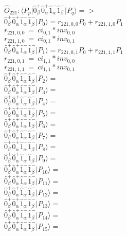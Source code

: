 \documentclass[14pt]{article}
\begin{document}
    $\hat{O}_{221}:  \langle{P_p}\vert \hat{0}_{\beta}^{+}\hat{0}_{\alpha}^{+}\hat{1}_{\alpha}^{-}\hat{1}_{\beta}^{-} \vert{P_q}\rangle => $ \\ 
    $ \hat{0}_{\beta}^{+}\hat{0}_{\alpha}^{+}\hat{1}_{\alpha}^{-}\hat{1}_{\beta}^{-} \vert{P_{0}}\rangle = {r}_{221,0,0}P_{0}+{r}_{221,1,0}P_{1} $ \\ 
    ${r}_{221,0,0}\ =\ {ci}_{0,1}*{inv}_{0,0} $ \\ 
    ${r}_{221,1,0}\ =\ {ci}_{0,1}*{inv}_{0,1} $ \\ 
    $ \hat{0}_{\beta}^{+}\hat{0}_{\alpha}^{+}\hat{1}_{\alpha}^{-}\hat{1}_{\beta}^{-} \vert{P_{1}}\rangle = {r}_{221,0,1}P_{0}+{r}_{221,1,1}P_{1} $ \\ 
    ${r}_{221,0,1}\ =\ {ci}_{1,1}*{inv}_{0,0} $ \\ 
    ${r}_{221,1,1}\ =\ {ci}_{1,1}*{inv}_{0,1} $ \\ 
    $ \hat{0}_{\beta}^{+}\hat{0}_{\alpha}^{+}\hat{1}_{\alpha}^{-}\hat{1}_{\beta}^{-} \vert{P_{2}}\rangle =  $ \\ 
    $ \hat{0}_{\beta}^{+}\hat{0}_{\alpha}^{+}\hat{1}_{\alpha}^{-}\hat{1}_{\beta}^{-} \vert{P_{3}}\rangle =  $ \\ 
    $ \hat{0}_{\beta}^{+}\hat{0}_{\alpha}^{+}\hat{1}_{\alpha}^{-}\hat{1}_{\beta}^{-} \vert{P_{4}}\rangle =  $ \\ 
    $ \hat{0}_{\beta}^{+}\hat{0}_{\alpha}^{+}\hat{1}_{\alpha}^{-}\hat{1}_{\beta}^{-} \vert{P_{5}}\rangle =  $ \\ 
    $ \hat{0}_{\beta}^{+}\hat{0}_{\alpha}^{+}\hat{1}_{\alpha}^{-}\hat{1}_{\beta}^{-} \vert{P_{6}}\rangle =  $ \\ 
    $ \hat{0}_{\beta}^{+}\hat{0}_{\alpha}^{+}\hat{1}_{\alpha}^{-}\hat{1}_{\beta}^{-} \vert{P_{7}}\rangle =  $ \\ 
    $ \hat{0}_{\beta}^{+}\hat{0}_{\alpha}^{+}\hat{1}_{\alpha}^{-}\hat{1}_{\beta}^{-} \vert{P_{8}}\rangle =  $ \\ 
    $ \hat{0}_{\beta}^{+}\hat{0}_{\alpha}^{+}\hat{1}_{\alpha}^{-}\hat{1}_{\beta}^{-} \vert{P_{9}}\rangle =  $ \\ 
    $ \hat{0}_{\beta}^{+}\hat{0}_{\alpha}^{+}\hat{1}_{\alpha}^{-}\hat{1}_{\beta}^{-} \vert{P_{10}}\rangle =  $ \\ 
    $ \hat{0}_{\beta}^{+}\hat{0}_{\alpha}^{+}\hat{1}_{\alpha}^{-}\hat{1}_{\beta}^{-} \vert{P_{11}}\rangle =  $ \\ 
    $ \hat{0}_{\beta}^{+}\hat{0}_{\alpha}^{+}\hat{1}_{\alpha}^{-}\hat{1}_{\beta}^{-} \vert{P_{12}}\rangle =  $ \\ 
    $ \hat{0}_{\beta}^{+}\hat{0}_{\alpha}^{+}\hat{1}_{\alpha}^{-}\hat{1}_{\beta}^{-} \vert{P_{13}}\rangle =  $ \\ 
    $ \hat{0}_{\beta}^{+}\hat{0}_{\alpha}^{+}\hat{1}_{\alpha}^{-}\hat{1}_{\beta}^{-} \vert{P_{14}}\rangle =  $ \\ 
    $ \hat{0}_{\beta}^{+}\hat{0}_{\alpha}^{+}\hat{1}_{\alpha}^{-}\hat{1}_{\beta}^{-} \vert{P_{15}}\rangle =  $ \\ 
    
\end{document}

